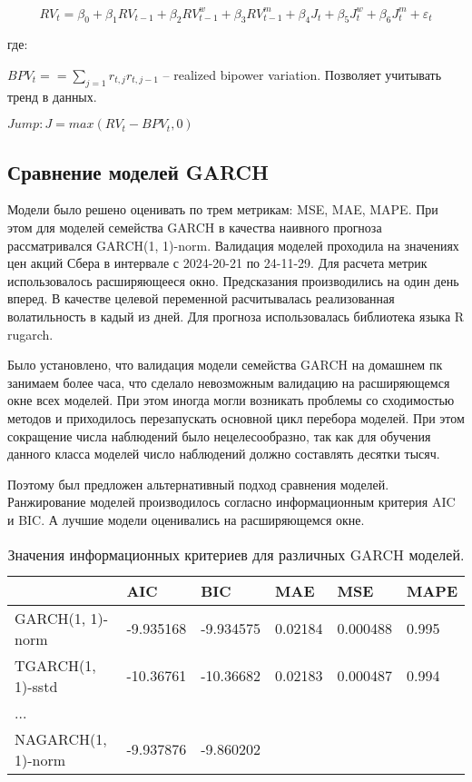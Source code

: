 \documentclass[]{article}
\begin{document}
$$RV_t = \beta_0 + \beta_1 RV_{t-1} + \beta_2 RV_{t-1}^w + \beta_3 RV_{t-1}^m + \beta_{4}J_t + \beta_5 J_t^w + \beta_6 J_t^m + \varepsilon_{t}$$

где:

$BPV_t == \sum_{j=1}r_{t, j}r_{t, j-1}$ -- realized bipower variation. Позволяет учитывать тренд в данных.

$Jump: J = max(RV_t - BPV_t, 0)$


\subsection{Сравнение моделей GARCH}


Модели было решено оценивать по трем метрикам: MSE, MAE, MAPE. При этом для моделей семейства GARCH в качества наивного прогноза рассматривался GARCH(1, 1)-norm. Валидация моделей проходила на значениях цен акций Сбера в интервале с 2024-20-21 по 24-11-29. Для расчета метрик использовалось расширяющееся окно. Предсказания производились на один день вперед. В качестве целевой переменной расчитывалась реализованная волатильность в кадый из дней.
Для прогноза использовалась библиотека языка R rugarch.

Было установлено, что валидация модели семейства GARCH на домашнем пк занимаем более часа, что сделало невозможным валидацию на расширяющемся окне всех моделей. При этом иногда могли возникать проблемы со сходимостью методов и приходилось перезапускать основной цикл перебора моделей. При этом сокращение числа наблюдений было нецелесообразно, так как для обучения данного класса моделей число наблюдений должно 
составлять десятки тысяч.

Поэтому был предложен альтернативный подход сравнения моделей. Ранжирование моделей производилось согласно информационным критерия AIC и BIC. А лучшие модели оценивались на расширяющемся окне.




\begin{table}[h!]
	\centering
	\caption{Значения информационных критериев для различных GARCH моделей.}
	\begin{tabularx}{\textwidth}{|X|X|X|l|l|l|}
		\hline
		                    	& AIC        & BIC        & MAE          & MSE             & MAPE    \\ \hline
		GARCH(1, 1)-norm        & -9.935168  & -9.934575  & 0.02184 &  0.000488   & 0.995   \\ \hline
		TGARCH(1, 1)-sstd       & -10.36761  & -10.36682  &0.02183  &0.000487     &0.994   \\ \hline
		     ...    &  &   &&&    \\ \hline
		NAGARCH(1, 1)-norm      & -9.937876  & -9.860202  &&&    \\ \hline
		
		
	\end{tabularx}
	\label{tab:1}
\end{table}
\end{document}

